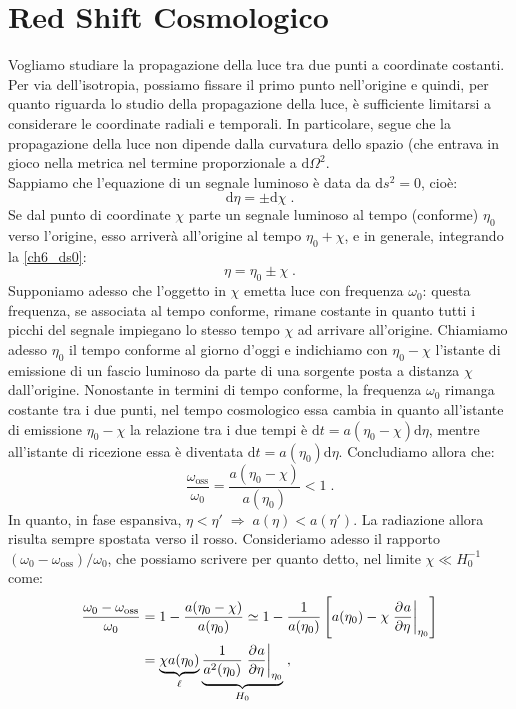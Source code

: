 \documentclass[12pt,a4paper]{report}
\theoremstyle{definition}
\newcommand{\pdev}[3][]{\frac{\partial^{#1} #2}{\partial #3^{#1}}}
\newcommand{\diff}[1][]{\mathrm{d}#1}
\begin{document}
\section{Red Shift Cosmologico}
Vogliamo studiare la propagazione della luce tra due punti a coordinate costanti. Per via dell'isotropia, possiamo fissare il primo punto nell'origine e quindi, per quanto riguarda lo studio della propagazione della luce, è sufficiente limitarsi a considerare le coordinate radiali e temporali. In particolare, segue che la propagazione della luce non dipende dalla curvatura dello spazio (che entrava in gioco nella metrica nel termine proporzionale a $\diff{\Omega}^2$. \\
Sappiamo che l'equazione di un segnale luminoso è data da $\diff{s}^2=0$, cioè:
\begin{equation}
\diff{\eta}=\pm \diff{\chi}\;. \label{ch6_ds0}
\end{equation}
Se dal punto di coordinate $\chi$ parte un segnale luminoso al tempo (conforme) $\eta_0$ verso l'origine, esso arriverà all'origine al tempo $\eta_0+\chi$, e in generale, integrando la \eqref{ch6_ds0}:
\begin{equation}
\eta=\eta_0\pm\chi\;.
\end{equation}
Supponiamo adesso che l'oggetto in $\chi$ emetta luce con frequenza $\omega_0$: questa frequenza, se associata al tempo conforme, rimane costante in quanto tutti i picchi del segnale impiegano lo stesso tempo $\chi$ ad arrivare all'origine. Chiamiamo adesso $\eta_0$ il tempo conforme al giorno d'oggi e indichiamo con $\eta_0-\chi$ l'istante di emissione di un fascio luminoso da parte di una sorgente posta a distanza $\chi$ dall'origine. Nonostante in termini di tempo conforme, la frequenza $\omega_0$ rimanga costante tra i due punti, nel tempo cosmologico essa cambia in quanto all'istante di emissione $\eta_0-\chi$ la relazione tra i due tempi è $\diff{t}=a(\eta_0-\chi)\diff{\eta}$, mentre all'istante di ricezione essa è diventata $\diff{t}=a(\eta_0)\diff{\eta}$. Concludiamo allora che:
\begin{equation}
\frac{\omega_{\mathrm{oss}}}{\omega_0}=\frac{a(\eta_0-\chi)}{a(\eta_0)}<1\;.
\end{equation}
In quanto, in fase espansiva, $\eta<\eta'\;\Longrightarrow\; a(\eta)<a(\eta')$. La radiazione allora risulta sempre spostata verso il rosso. Consideriamo adesso il rapporto $(\omega_0-\omega_{\mathrm{oss}})/\omega_0$, che possiamo scrivere per quanto detto, nel limite $\chi\ll H_0^{-1}$ come:
\begin{align}
\frac{\omega_0-\omega_{\mathrm{oss}}}{\omega_0}&= 1-\frac{a(\eta_0-\chi)}{a(\eta_0)}\simeq 1-\frac{1}{a(\eta_0)}\left[a(\eta_0)-\chi\left.\pdev{a}{\eta}\right|_{\eta_0}\right] \notag \\
&= \underbrace{\chi a(\eta_0)}_{\ell}\underbrace{\frac{1}{a^2(\eta_0)}\left.\pdev{a}{\eta}\right|_{\eta_0}}_{H_0}\;,
\end{align}
\end{document}
